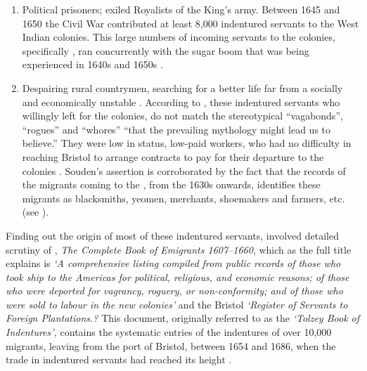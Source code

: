 \begin{enumerate}
\item{Political prisoners; exiled Royalists of the King's army. Between 1645 and 1650 the  Civil War contributed at least 8,000 indentured servants to the West Indian colonies. This large numbers of incoming servants to the  colonies, specifically , ran concurrently with the sugar boom that was being experienced in 1640s and 1650s \citep{Brewer96}.}
\sloppy
\item{Despairing rural  countrymen, searching for a better life far from a socially and economically unstable . According to \citet[167]{Souden88}, these indentured servants who willingly left for the colonies, do not match the stereotypical ``vagabonds'', ``rogues'' and ``whores'' ``that the prevailing mythology might lead us to believe.'' They were low in status, low-paid workers, who had no difficulty in reaching Bristol to arrange contracts to pay for their departure to the colonies \citep{Souden88}. Souden's assertion is corroborated by the fact that the records of the migrants coming to the , from the 1630s onwards, identifies these migrants as blacksmiths, yeomen, merchants, shoemakers and farmers, etc. (see \citealt{Coldham87, Sacks93}).}
\fussy
\end{enumerate}

Finding out the origin of most of these indentured servants, involved detailed scrutiny of  , \emph{The Complete Book of Emigrants 1607--1660}, which as the full title explains is \emph{`A comprehensive listing compiled from  public records of those who took ship to the Americas for political, religious, and economic reasons; of those who were deported for vagrancy, roguery, or non-conformity; and of those who were sold to labour in the new colonies'} and the Bristol \emph{`Register of Servants to Foreign Plantations.?} This document, originally referred to as the \emph{`Tolzey Book of Indentures',} contains the systematic entries of the indentures of over 10,000  migrants, leaving from the port of Bristol, between 1654 and 1686, when the trade in indentured servants had reached its height \citep{Currer82, Morgan93}.

